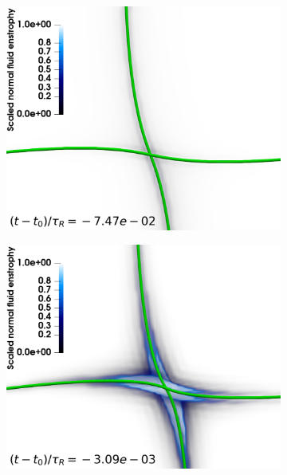 \documentclass[%
 reprint,
 amsmath,amssymb,
 aps,
 prl,
]{revtex4-2}
\begin{document}
\begin{figure}
	\centering
    \begin{subfigure}[b]{0.24\textwidth}
		\centering
		\includegraphics*[width=\textwidth]{snap-1.pdf}
	\end{subfigure}
	\begin{subfigure}[b]{0.24\textwidth}
		\centering
		\includegraphics*[width=\textwidth]{snap-2.pdf}
	\end{subfigure}
    \begin{subfigure}[b]{0.24\textwidth}
		\centering

\end{subfigure}
\end{figure}
\end{document}
